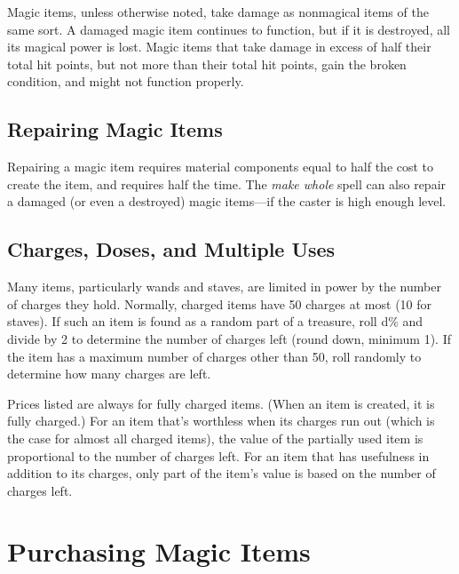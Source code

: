 Magic items, unless otherwise noted, take damage as nonmagical items of the same sort. A damaged magic item continues to function, but if it is destroyed, all its magical power is lost. Magic items that take damage in excess of half their total hit points, but not more than their total hit points, gain the broken condition, and might not function properly.
				
\subsection{Repairing Magic Items}

				
Repairing a magic item requires material components equal to half the cost to create the item, and requires half the time. The \textit{make whole }spell can also repair a damaged (or even a destroyed) magic items---if the caster is high enough level.
				
\subsection{Charges, Doses, and Multiple Uses}

				
Many items, particularly wands and staves, are limited in power by the number of charges they hold. Normally, charged items have 50 charges at most (10 for staves). If such an item is found as a random part of a treasure, roll d\% and divide by 2 to determine the number of charges left (round down, minimum 1). If the item has a maximum number of charges other than 50, roll randomly to determine how many charges are left. 
				
Prices listed are always for fully charged items. (When an item is created, it is fully charged.) For an item that's worthless when its charges run out (which is the case for almost all charged items), the value of the partially used item is proportional to the number of charges left. For an item that has usefulness in addition to its charges, only part of the item's value is based on the number of charges left.
				
\section{Purchasing Magic Items}

